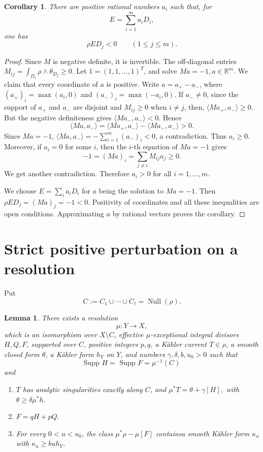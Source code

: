 \documentclass[reqno]{amsart}
\theoremstyle{remark}
\theoremstyle{plain}
\newtheorem{cor}[thm]{Corollary}
\newtheorem{lemma}[thm]{Lemma}
\begin{document}
\begin{cor}\label{cor:antinef}
There are positive rational numbers $a_i$ such that, for
\[
 E=\sum_{i=1}^m a_iD_i,
\]
one has
\begin{equation}\label{eq:antinef}
 \rho ED_j<0\qquad(1\leq j\leq m).
\end{equation}
    
\end{cor}
\begin{proof}
    Since $M$ is negative definite, it is invertible. The off-diagonal entries $M_{ij}=\int_{D_i}\rho\wedge\theta_{D_j}\geq 0$. Let $\mathfrak{1}=(1,1,...,1)^T$, and solve $Ma=-\mathfrak{1}, a\in \mathbb{R}^m$. We claim that every coordinate of $a$ is positive.  Write $a=a_+-a_-$, where $(a_+)_i=\max(a_i,0)$ and $(a_-)_i=\max(-a_i,0)$. If $a_-\neq 0$, since the support of $a_+$ and $a_-$ are disjoint and $M_{ij}\geq 0$ when $i\neq j$, then, $\langle Ma_+,a_-\rangle\geq 0$. But the negative definiteness gives $\langle Ma_-,a_-\rangle<0$. Hence \[
    \langle Ma,a_-\rangle=\langle Ma_+,a_-\rangle-\langle Ma_-,a_-\rangle>0.
    \]
    Since $Ma=-\mathfrak 1$, $\langle Ma,a_-\rangle=-\sum_{i=1}^m(a_-)_i <0$, a contradiction. Thus $a_i\geq 0.$ Moreover, if $a_i=0$ for some $i$, then the $i$-th equation of $Ma=-\mathfrak 1$ gives \[
    -1=(Ma)_i=\sum_{j\neq i}M_{ij}a_j\geq0.
    \]We get another contradiction. Therefore $a_i>0$ for all $i=1,...,m$.


    We choose $E=\sum_ia_iD_i$ for $a$ being the solution to $Ma=-\mathfrak 1$. Then $\rho ED_j=(Ma)_j=-1<0$. Positivity of coordinates and all these inequalities are open conditions. Approximating $a$ by rational vectors proves the corollary. 
\end{proof}


\section{Strict positive perturbation on a resolution
}
Put
\[
 C:=C_1\cup\cdots\cup C_\ell=\operatorname{Null}(\rho).
\] 
\begin{lemma}\label{lem:resolved-model}
There exists a resolution
\[
 \mu:Y\longrightarrow X,
\]
which is an isomorphism over $X\setminus C$, effective
$\mu$-exceptional integral divisors $H,Q,F$, supported over $C$, positive integers $p,q$, a K\"ahler current $T\in \rho$, a smooth closed form $\theta$, a
K\"ahler form $h_Y$ on $Y$, and  numbers $\gamma,\delta,b,u_0>0$ such that  \[
\text{Supp }H=\text{ Supp }F=\mu^{-1}(C)\] and 
\begin{enumerate}[label=\textup{(\roman*)}]
\item $T$ has analytic singularities exactly along $C$, and $\mu^*T=\theta+\gamma [H], $ with $\theta\geq \delta\mu^*h$.
\item $F=qH+pQ$.
\item For every $0<u<u_0$,  the class $\mu^*\rho-\mu[F]$ containsa smooth K\"ahler form $\kappa_u$ with $\kappa_u\geq buh_Y$.
\end{enumerate}
\end{lemma}
 
\end{document}
